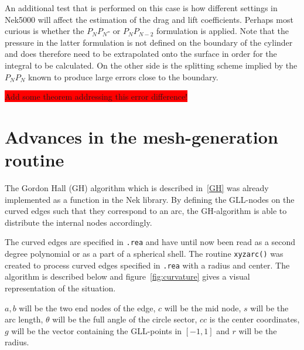 An additional test that is performed on this case is how different settings in Nek5000 will affect the estimation of the drag and lift coefficients.
Perhaps most curious is whether the $P_NP_N$- or $P_NP_{N-2}$ formulation is applied. Note that the pressure in the latter formulation is 
not defined on the boundary of the cylinder and does therefore need to be extrapolated onto the surface in order for the integral to be 
calculated. On the other side is the splitting scheme implied by the $P_NP_N$ known to produce large errors close to the boundary. 

\colorbox{red}{Add some theorem addressing this error difference! }
%

\section{Advances in the mesh-generation routine} \label{xyzarc}

The Gordon Hall (GH) algorithm which is described in~\ref{GH} was already implemented as a function in the Nek library.
By defining the GLL-nodes on the curved edges such that they correspond to an arc, the GH-algorithm is able to distribute 
the internal nodes accordingly. 

The curved edges are specified in \verb|.rea| and have until now been read as a second degree polynomial or as a part of a 
spherical shell. The routine \verb|xyzarc()| was created to process curved edges specified in \verb|.rea| with a radius and center.
The algorithm is described below and figure~\ref{fig:curvature} gives a visual representation of the situation.

$a,b$ will be the two end nodes of the edge, 
$c$ will be the mid node, 
$s$ will be the arc length, 
$\theta$ will be the full angle of the circle sector,
$cc$ is the center coordinates, 
$g$ will be the vector containing the GLL-points in $[-1,1]$ 
and $r$ will be the radius.

